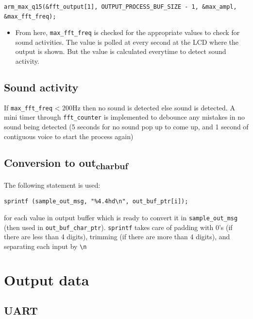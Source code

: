 \documentclass[11pt]{article}
\begin{document}
\begin{verbatim}
arm_max_q15(&fft_output[1], OUTPUT_PROCESS_BUF_SIZE - 1, &max_ampl, &max_fft_freq);
\end{verbatim}

\begin{itemize}
\item From here, \texttt{max\_fft\_freq} is checked for the appropriate values to check for sound activities. The value is polled at every second at the LCD where the output is shown. But the value is calculated everytime to detect sound activity.
\end{itemize}

\subsection{Sound activity}
\label{sec:org73d8d2b}

If \texttt{max\_fft\_freq} < 200Hz then no sound is detected else sound is detected. A mini timer through \texttt{fft\_counter} is implemented to debounce any mistakes in no sound being detected (5 seconds for no sound pop up to come up, and 1 second of contiguous voice to start the process again)

\subsection{Conversion to out\textsubscript{char}\textsubscript{buf}}
\label{sec:orgd11feab}

The following statement is used:
\begin{verbatim}
sprintf (sample_out_msg, "%4.4hd\n", out_buf_ptr[i]);
\end{verbatim}

for each value in output buffer which is ready to convert it in \texttt{sample\_out\_msg} (then used in \texttt{out\_buf\_char\_ptr}). \texttt{sprintf} takes care of padding with 0's (if there are less than 4 digits), trimming (if there are more than 4 digits), and separating each input by \texttt{\textbackslash{}n}


\section{Output data}
\label{sec:org8b575c5}

\subsection{UART}
\label{sec:org13028f8}
\end{document}
